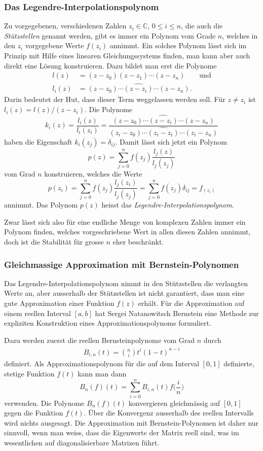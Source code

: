 \subsubsection{Das Legendre-Interpolationspolynom}
%
Zu vorgegebenen, verschiedenen Zahlen $z_i\in\mathbb{C}$, $0\le i\le n$,
die auch die {\em Stützstellen} genannt werden,
%
gibt es immer ein Polynom vom Grade $n$, welches in den $z_i$ vorgegebene
Werte $f(z_i)$ annimmt.
Ein solches Polynom lässt sich im Prinzip mit Hilfe eines linearen
Gleichungssystems finden, man kann aber auch direkt eine Lösung
konstruieren.
Dazu bildet man erst die Polynome
\begin{align*}
l(z) &= (z-z_0)(z-z_1)\cdots (z-z_n) \qquad\text{und}
\\
l_i(z) &= (z-z_0)\cdots \widehat{(z-z_i)}\cdots (z-z_n).
\end{align*}
Darin bedeutet der Hut, dass dieser Term weggelassen werden soll.
Für $z\ne z_i$ ist $l_i(z)=l(z)/(z-z_i)$.
Die Polynome
\[
k_i(z)
=
\frac{l_i(z)}{l_i(z_i)}
=
\frac{(z-z_0)\cdots \widehat{(z-z_i)}\cdots (z-z_n)}{(z_i-z_0)\cdots \widehat{(z_i-z_i)}\cdots (z_i-z_n)}
\]
haben die Eigenschaft
$k_i(z_j)=\delta_{i\!j}$.
Damit lässt sich jetzt ein Polynom
\[
p(z) = \sum_{j=0}^n f(z_j) \frac{l_j(z)}{l_j(z_j)}
\]
vom Grad $n$ konstruieren, welches die Werte
\[
p(z_i)
=
\sum_{j=0}^n f(z_j) \frac{l_j(z_i)}{l_j(z_j)}
=
\sum_{j=0}^n f(z_j) \delta_{i\!j}
=
f_(z_i)
\]
annimmt.
Das Polynom $p(z)$ heisst das {\em Legendre-Interpolationspolynom}.

Zwar lässt sich also für eine endliche Menge von komplexen Zahlen immer
ein Polynom finden, welches vorgeschriebene Wert in allen diesen Zahlen
annimmt, doch ist die Stabilität für grosse $n$ eher beschränkt.


\subsubsection{Gleichmassige Approximation mit Bernstein-Polynomen}
%
Das Legendre-Interpolationspolynom nimmt in den  Stützstellen die
verlangten Werte an, aber ausserhalb der Stützstellen ist nicht
garantiert, dass man eine gute Approximation einer Funktion $f(z)$
erhält.
Für die Approximation auf einem reellen Interval $[a,b]$ hat
Sergei Natanowitsch Bernstein eine Methode zur expliziten
Konstruktion eines Approximationspolynoms formuliert.

Dazu werden zuerst die reellen Bernsteinpolynome vom Grad $n$
durch
\begin{align*}
B_{i,n}(t) = \binom{n}{i} t^i(1-t)^{n-i}
\end{align*}
definiert.
Als Approximationspolynom für die auf dem Interval 
$[0,1]$ definierte, stetige Funktion $f(t)$ kann man dann
\[
B_n(f)(t)
=
\sum_{i=0}^n B_{i,n}(t) f\biggl(\frac{i}{n}\biggr)
\]
verwenden.
Die Polynome $B_n(f)(t)$ konvergieren gleichmässig auf $[0,1]$
gegen die Funktion $f(t)$.
Über die Konvergenz ausserhalb des reellen Intervalls wird nichts
ausgesagt.
Die Approximation mit Bernstein-Polynomen ist daher nur sinnvoll,
wenn man weiss, dass die Eigenwerte der Matrix reell sind, was im
wesentlichen auf diagonalisierbare Matrizen führt.

